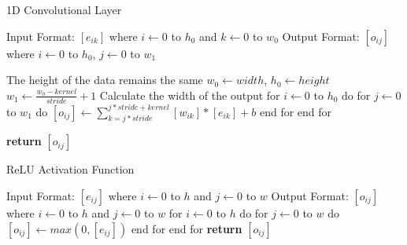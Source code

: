 \documentclass[10pt]{article}
\begin{document}
\begin{algorithm}[H]
  \caption{1D Convolutional Layer}
  \begin{algorithmic}[3]
      \State Input Format: $[e_{ik}]$ where $i \gets 0$ to $h_0$ and $k \gets 0$ to $w_0$
      \State Output Format: $[o_{ij}]$ where $i \gets 0$ to $h_0$, $j \gets 0$ to $w_1$

      \Comment The height of the data remains the same
      \State $w_0 \gets width$, $h_0 \gets height$
      \State $w_1 \gets \frac{w_0 - kernel}{stride} + 1$  \Comment Calculate the width of the output
      \State for $i \gets 0$ to $h_0$ do
      \State \hspace{1cm} for $j \gets 0$ to $w_1$ do
      \State \hspace{2cm} $[o_{ij}] \gets \sum_{k=j*stride}^{j*stride + kernel} [w_{ik}] * [e_{ik}] + b$ 
      \State \hspace{1cm} end for
      \State end for

      \State \textbf{return} $[o_{ij}]$
      \EndProcedure
  \end{algorithmic}
\end{algorithm}

\begin{algorithm}[H]
\caption{ReLU Activation Function}
    \begin{algorithmic}[4]
          \State Input Format: $[e_{ij}]$ where $i \gets 0$ to $h$ and $j \gets 0$ to $w$
          \State 
          \State Output Format: $[o_{ij}]$ where $i \gets 0$ to $h$ and $j \gets 0$ to $w$
          \State
          \State for $i \gets 0$ to $h$ do
          \State \hspace{1cm} for $j \gets 0$ to $w$ do
          \State \hspace{2cm} $[o_{ij}] \gets max(0, [e_{ij}])$ 
          \State \hspace{1cm} end for
          \State end for
          \State \textbf{return} $[o_{ij}]$ 
    \EndProcedure
    \end{algorithmic}

\end{algorithm}
\end{document}
